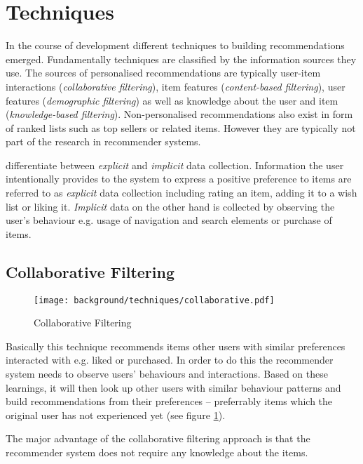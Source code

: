 \section{Techniques}

In the course of development different techniques to building recommendations emerged. Fundamentally techniques are classified by the information sources they use. The sources of personalised recommendations are typically user-item interactions (\textit{collaborative filtering}), item features (\textit{content-based filtering}), user features (\textit{demographic filtering}) as well as knowledge about the user and item (\textit{knowledge-based filtering}). Non-personalised recommendations also exist in form of ranked lists such as top sellers or related items. However they are typically not part of the research in recommender systems.

\citet{anand03} differentiate between \textit{explicit} and \textit{implicit} data collection. Information the user intentionally provides to the system to express a positive preference to items are referred to as \textit{explicit} data collection including rating an item, adding it to a wish list or liking it. \textit{Implicit} data on the other hand is collected by observing the user's behaviour e.g. usage of navigation and search elements or purchase of items.

\subsection{Collaborative Filtering}
\label{bg-tech-collaborative}

\begin{figure}[ht]
    \texttt{[image: background/techniques/collaborative.pdf]}
    \caption{Collaborative Filtering}
    \label{fig:collaborative}
\end{figure}

Basically this technique recommends items other users with similar preferences interacted with e.g. liked or purchased. In order to do this the recommender system needs to observe users' behaviours and interactions. Based on these learnings, it will then look up other users with similar behaviour patterns and build recommendations from their preferences -- preferrably items which the original user has not experienced yet (see figure \ref{fig:collaborative}).

The major advantage of the collaborative filtering approach is that the recommender system does not require any knowledge about the items.

